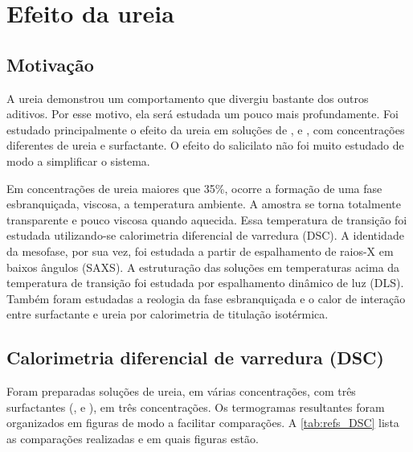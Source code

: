 \chapter{Efeito da ureia}
\label{sec:cap_efeito_ureia}
\section{Motivação}
A ureia demonstrou um comportamento que divergiu bastante dos outros aditivos. Por esse motivo, ela será estudada um pouco mais profundamente. Foi estudado principalmente o efeito da ureia em soluções de \CTAB{}, \TTAB{} e \DTAB, com concentrações diferentes de ureia e surfactante. O efeito do salicilato não foi muito estudado de modo a simplificar o sistema.


Em concentrações de ureia maiores que 35\%, ocorre a formação de uma fase esbranquiçada, viscosa, a temperatura ambiente. A amostra se torna totalmente transparente e pouco viscosa quando aquecida. Essa temperatura de transição foi estudada utilizando-se calorimetria diferencial de varredura (DSC). A identidade da mesofase, por sua vez, foi estudada a partir de espalhamento de raios-X em baixos ângulos (SAXS). A estruturação das soluções em temperaturas acima da temperatura de transição foi estudada por espalhamento dinâmico de luz (DLS). Também foram estudadas a reologia da fase esbranquiçada e o calor de interação entre surfactante e ureia por calorimetria de titulação isotérmica.

\section{Calorimetria diferencial de varredura (DSC)}

	Foram preparadas soluções de ureia, em várias concentrações, com três surfactantes (\CTAB, \TTAB{} e \DTAB), em três concentrações. Os termogramas resultantes foram organizados em figuras de modo a facilitar comparações. A \autoref{tab:refs_DSC} lista as comparações realizadas e em quais figuras estão.
    
